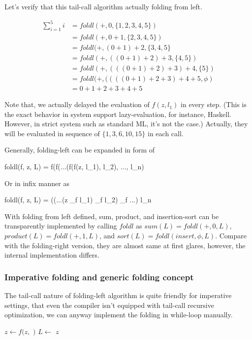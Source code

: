 \documentclass[b5paper]{article}
\begin{document}
Let's verify that this tail-call algorithm actually folding from left.

\[
\begin{array}{rl}
\sum_{i=1}^{5}i & = foldl(+, 0, \{1, 2, 3, 4, 5\}) \\
                & = foldl(+, 0 + 1, \{ 2, 3, 4, 5 \}) \\
                & = foldl(+, (0 + 1) + 2, \{3, 4, 5 \} \\
                & = foldl(+, ((0 + 1) + 2) + 3, \{4, 5\}) \\
                & = foldl(+, (((0 + 1) + 2) + 3) + 4, \{5\}) \\
                & = foldl(+, ((((0 + 1) + 2 + 3) + 4 + 5, \phi) \\
                & = 0 + 1 + 2 + 3 + 4 + 5
\end{array}
\]

Note that, we actually delayed the evaluation of $f(z, l_1)$ in every step. (This is the exact behavior
in system support lazy-evaluation, for instance, Haskell. However, in strict system such as standard ML, it's not the case.) Actually, they will be evaluated in sequence
of $\{ 1, 3, 6, 10, 15\}$ in each call.

Generally, folding-left can be expanded in form of

\be
foldl(f, z, L) = f(f(...(f(f(z, l_1), l_2), ..., l_n)
\ee

Or in infix manner as

\be
foldl(f, z, L) = ((...(z \oplus_f l_1) \oplus_f l_2) \oplus_f ...) \oplus l_n
\ee

With folding from left defined, sum, product, and insertion-sort can be transparently implemented by calling
$foldl$ as $sum(L) = foldl(+, 0, L)$, $product(L) = foldl(+, 1, L)$, and $sort(L) = foldl(insert, \phi, L)$.
Compare with the folding-right version, they are almost same at first glares, however, the internal implementation
differs.

\subsubsection{Imperative folding and generic folding concept}
The tail-call nature of folding-left algorithm is quite friendly for imperative settings, that even the compiler
isn't equipped with tail-call recursive optimization, we can anyway implement the folding in while-loop manually.

\begin{algorithmic}[1]
    \State $z \gets f(z, $  $)$
    \State $L \gets$ 
  \EndWhile
  \State \Return $z$
\EndFunction
\end{algorithmic}
\end{document}
